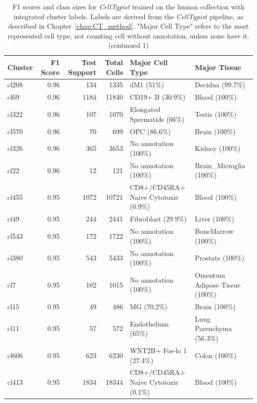 \begin{table}[ht!]
\scriptsize
\caption[F1 scores and class sizes for \textit{CellTypist} trained on the human collection with integrated cluster labels (continued 1)]{F1 scores and class sizes for \textit{CellTypist} trained on the human collection with integrated cluster labels. Labels are derived from the \textit{CellTypist} pipeline, as described in Chapter~\ref{chap:CT_method}. "Major Cell Type" refers to the most represented cell type, not counting cell without annotation, unless none have it. (continued 1)}
\centering
\label{table:tab_HAmodelclust1}
\begin{tabular}{lrrrll}
  \toprule
Cluster & F1 Score & Test Support & Total Cells & Major Cell Type & Major Tissue \\ 
  \midrule  
  cl208 & 0.96 & 134 & 1335 & dM1 (51\%) & Decidua (99.7\%) \\ 
  cl69 & 0.96 & 1184 & 11840 & CD19+ B (30.9\%) & Blood (100\%) \\ 
  cl322 & 0.96 & 107 & 1070 & Elongated Spermatids (66\%) & Testis (100\%) \\ 
  cl570 & 0.96 &  70 & 699 & OPC (86.6\%) & Brain (100\%) \\ 
  cl326 & 0.96 & 365 & 3653 & No annotation (100\%) & Kidney (100\%) \\ 
  cl22 & 0.96 &  12 & 121 & No annotation (100\%) & Brain\_Microglia (100\%) \\ 
  cl455 & 0.95 & 1072 & 10721 & \specialcell[t]{CD8+/CD45RA+\\Naive Cytotoxic (0.9\%)} & Blood (100\%) \\ 
  cl49 & 0.95 & 244 & 2441 & Fibroblast (29.9\%) & Liver (100\%) \\ 
  cl543 & 0.95 & 172 & 1722 & No annotation (100\%) & BoneMarrow (100\%) \\ 
  cl380 & 0.95 & 543 & 5433 & No annotation (100\%) & Prostate (100\%) \\ 
  cl7 & 0.95 & 102 & 1015 & No annotation (100\%) & Omentum Adipose Tissue (100\%) \\ 
  cl15 & 0.95 &  49 & 486 & MG (70.2\%) & Brain (100\%) \\ 
  cl11 & 0.95 &  57 & 572 & Endothelium (65\%) & Lung Parenchyma (56.3\%) \\ 
  cl606 & 0.95 & 623 & 6230 & WNT2B+ Fos-lo 1 (27.4\%) & Colon (100\%) \\ 
  cl413 & 0.95 & 1834 & 18344 & \specialcell[t]{CD8+/CD45RA+\\Naive Cytotoxic (0.1\%)} & Blood (100\%) \\ 

\end{tabular}
\end{table}
